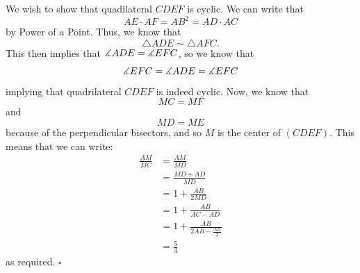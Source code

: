 \documentclass{article}
\begin{document}
We wish to show that quadilateral $CDEF$ is cyclic. We can write that \[AE\cdot AF = AB^2 = AD \cdot AC\] by Power of a Point. Thus, we know that \[\triangle ADE \sim \triangle AFC.\] This then implies that $\measuredangle ADE = \measuredangle EFC$, so we know that \[\measuredangle EFC = \measuredangle ADE = \measuredangle EFC\] implying that quadrilateral $CDEF$ is indeed cyclic. Now, we know that \[MC = MF\] and \[MD = ME\] because of the perpendicular bisectors, and so $M$ is the center of $(CDEF)$. This means that we can write:
\begin{align*}
\frac{AM}{MC} &= \frac{AM}{MD} \\
&= \frac{MD+AD}{MD} \\
&= 1+\frac{AB}{2MD} \\
&= 1+\frac{AB}{AC-AD} \\
&= 1+\frac{AB}{2AB-\tfrac{AB}{2}} \\
&= \boxed{\frac{5}{3}}
\end{align*}
as required. $\square$
\end{document}
